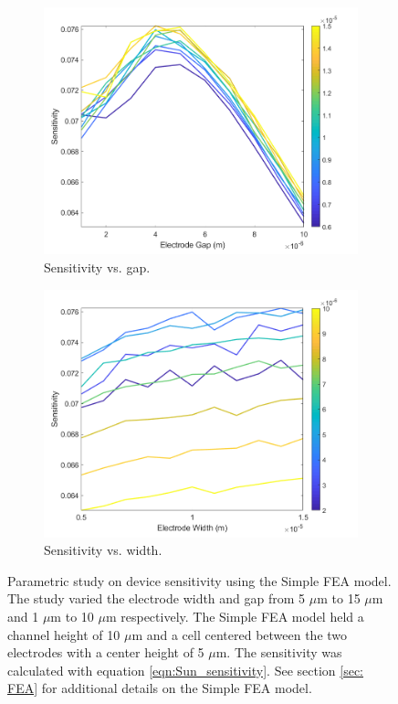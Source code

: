 \begin{figure}[h]
\begin{subfigure}[t]{0.49\textwidth}
    \end{subfigure}
    \\
    \vspace{0.1 in}
    \begin{subfigure}[t]{0.49\textwidth}
        \centering
        \includegraphics[width=\textwidth]{images/comsol_simple_gapXsensitivity.png}
        \caption{Sensitivity vs. gap.}
    \end{subfigure}
    \hfill
    \begin{subfigure}[t]{0.49\textwidth}
        \centering
        \includegraphics[width=\textwidth]{images/comsol_simple_widthXsensitivity.png}
        \caption{Sensitivity vs. width.}
    \end{subfigure}
    \caption[Simple FEA model sensitivity]{Parametric study on device sensitivity using the Simple FEA model. The study varied the electrode width and gap from 5 $\mu$m to 15 $\mu$m and 1 $\mu$m to 10 $\mu$m respectively. The Simple FEA model held a channel height of 10 $\mu$m and a cell centered between the two electrodes with a center height of 5 $\mu$m. The sensitivity was calculated with equation \ref{eqn:Sun_sensitivity}. See section \ref{sec: FEA} for additional details on the Simple FEA model.} 
    \label{fig:simple_sensitivity}
\end{figure}

